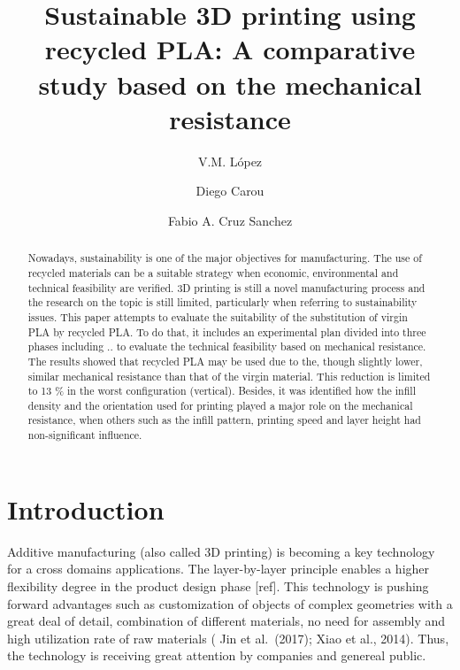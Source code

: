 \documentclass[]{elsarticle} %
\begin{document}
\begin{frontmatter}

  \title{Sustainable 3D printing using recycled PLA: A comparative study
based on the mechanical resistance}
    \author[University of Jaén]{V.M. López}
    \author[University of Vigo]{Diego Carou}
    \author[Université de Lorraine, ERPI, F-54000 Nancy, France]{Fabio
A. Cruz Sanchez}
      \address[Department of Mechanical and Mining Engineering]{Campus
Las Lagunillas, 23071 Jaén, Spain}
    \address[Department of Design in Engineering]{Campus As Lagoas,
32004 Ourense, Spain}
  
  \begin{abstract}
  Nowadays, sustainability is one of the major objectives for
  manufacturing. The use of recycled materials can be a suitable
  strategy when economic, environmental and technical feasibility are
  verified. 3D printing is still a novel manufacturing process and the
  research on the topic is still limited, particularly when referring to
  sustainability issues. This paper attempts to evaluate the suitability
  of the substitution of virgin PLA by recycled PLA. To do that, it
  includes an experimental plan divided into three phases including ..
  to evaluate the technical feasibility based on mechanical resistance.
  The results showed that recycled PLA may be used due to the, though
  slightly lower, similar mechanical resistance than that of the virgin
  material. This reduction is limited to 13 \% in the worst
  configuration (vertical). Besides, it was identified how the infill
  density and the orientation used for printing played a major role on
  the mechanical resistance, when others such as the infill pattern,
  printing speed and layer height had non-significant influence.
  \end{abstract}
  
 \end{frontmatter}

\hypertarget{introduction}{%
\section{Introduction}\label{introduction}}

Additive manufacturing (also called 3D printing) is becoming a key
technology for a cross domains applications. The layer-by-layer
principle enables a higher flexibility degree in the product design
phase {[}ref{]}. This technology is pushing forward advantages such as
customization of objects of complex geometries with a great deal of
detail, combination of different materials, no need for assembly and
high utilization rate of raw materials ( Jin et al.~(2017); Xiao et al.,
2014). Thus, the technology is receiving great attention by companies
and genereal public.
\end{document}

